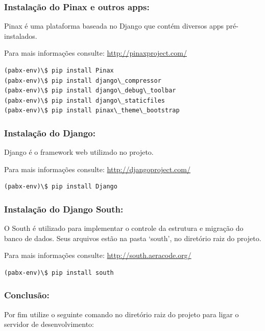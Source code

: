 \documentclass[letterpaper,10pt,brazil]{sphinxmanual}
\begin{document}
\subsubsection{Instalação do Pinax e outros apps:}
\label{inicio:instalacao-do-pinax-e-outros-apps}
Pinax é uma plataforma baseada no Django que contém diversos apps pré-instalados.

Para mais informações consulte: \href{http://pinaxproject.com/}{http://pinaxproject.com/}

\begin{Verbatim}[commandchars=\\\{\}]
(pabx-env)\$ pip install Pinax
(pabx-env)\$ pip install django\_compressor
(pabx-env)\$ pip install django\_debug\_toolbar
(pabx-env)\$ pip install django\_staticfiles
(pabx-env)\$ pip install pinax\_theme\_bootstrap
\end{Verbatim}


\subsubsection{Instalação do Django:}
\label{inicio:instalacao-do-django}
Django é o framework web utilizado no projeto.

Para mais informações consulte: \href{http://djangoproject.com/}{http://djangoproject.com/}

\begin{Verbatim}[commandchars=\\\{\}]
(pabx-env)\$ pip install Django
\end{Verbatim}


\subsubsection{Instalação do Django South:}
\label{inicio:instalacao-do-django-south}
O South é utilizado para implementar o controle da estrutura e migração do banco de dados. Seus arquivos estão na pasta `south', no diretório raiz do projeto.

Para mais informações consulte: \href{http://south.aeracode.org/}{http://south.aeracode.org/}

\begin{Verbatim}[commandchars=\\\{\}]
(pabx-env)\$ pip install south
\end{Verbatim}


\subsubsection{Conclusão:}
\label{inicio:conclusao}
Por fim utilize o seguinte comando no diretório raiz do projeto para ligar o servidor de desenvolvimento:
\end{document}
